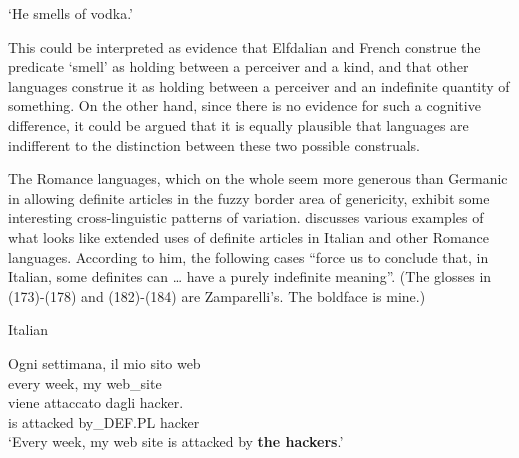 \glt ‘He smells of vodka.’

\z

This could be interpreted as evidence that Elfdalian and French construe the predicate ‘smell’ as holding between a perceiver and a kind, and that other languages construe it as holding between a perceiver and an indefinite quantity of something. On the other hand, since there is no evidence for such a cognitive difference, it could be argued that it is equally plausible that languages are indifferent to the distinction between these two possible construals. 


The Romance languages, which on the whole seem more generous than Germanic in allowing definite articles in the fuzzy border area of genericity, exhibit some interesting cross-linguistic patterns of variation. \citet{Zamparelli2002} discusses various examples of what looks like extended uses of definite articles in Italian and other Romance languages. According to him, the following cases “force us to conclude that, in Italian, some definites can … have a purely indefinite meaning”. (The glosses in (173){}-(178) and (182){}-(184) are Zamparelli’s. The boldface is mine.)


\item 

\label{bkm:Ref172696600}\label{bkm:Ref69030048}Italian



 \ea\label{}
\gll Ogni  settimana,  il mio  sito web\\


every  week,  my  web\_site\\

 \ea\label{}
\gll viene  attaccato  dagli  hacker.\\


is  attacked  by\_DEF.PL  hacker\\

\glt ‘Every week, my web site is attacked by \textbf{the hackers}.’

